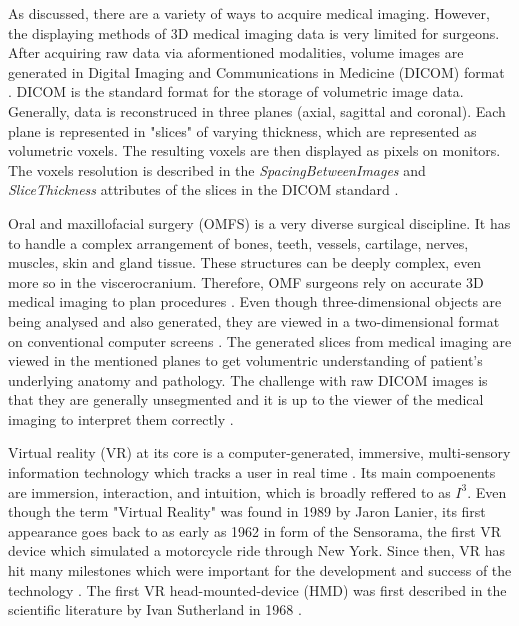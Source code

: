 As discussed, there are a variety of ways to acquire medical imaging.
However, the displaying methods of 3D medical imaging data is very limited for surgeons.
After acquiring raw data via aformentioned modalities, volume images are generated in Digital Imaging and Communications in Medicine (DICOM) format \cite{DICOMStandard}.
DICOM is the standard format for the storage of volumetric image data.
Generally, data is reconstruced in three planes (axial, sagittal and coronal).
Each plane is represented in "slices" of varying thickness, which are represented as volumetric voxels.
The resulting voxels are then displayed as pixels on monitors.
The voxels resolution is described in the \textit{SpacingBetweenImages} and \textit{SliceThickness} attributes of the slices in the DICOM standard \cite{DICOMStandard}.

Oral and maxillofacial surgery (OMFS) is a very diverse surgical discipline. It has to handle a complex arrangement of bones, teeth, vessels, cartilage, nerves, muscles, skin and gland tissue.
These structures can be deeply complex, even more so in the viscerocranium.
Therefore, OMF surgeons rely on accurate 3D medical imaging to plan procedures \cite{Fonseca.2018}.
Even though three-dimensional objects are being analysed and also generated, they are viewed in a two-dimensional format on conventional computer screens \cite{brewster1984interactive}.
The generated slices from medical imaging are viewed in the mentioned planes to get volumentric understanding of patient's underlying anatomy and pathology.
The challenge with raw DICOM images is that they are generally unsegmented and it is up to the viewer of the medical imaging to interpret them correctly \cite{Handels.2009}.


Virtual reality (VR) at its core is a computer-generated, immersive, multi-sensory information technology which tracks a user in real time \cite{burdea2003virtual}.
Its main compoenents are immersion, interaction, and intuition, which is broadly reffered to as $I^3$.
Even though the term "Virtual Reality" was found in 1989 by Jaron Lanier, its first appearance goes back to as early as 1962 in form of the Sensorama, the first VR device which simulated a motorcycle ride through New York\cite{heilig1962sensorama}.
Since then, VR has hit many milestones which were important for the development and success of the technology \cite{burdea2003virtual}.
The first VR head-mounted-device (HMD) was first described in the scientific literature by Ivan Sutherland in 1968 \cite{sutherland1968head}.

